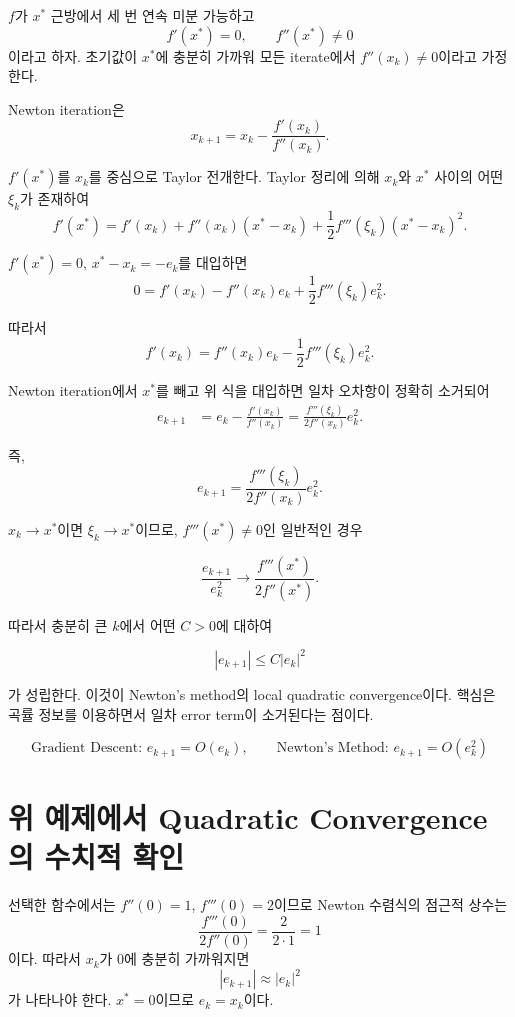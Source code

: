 \documentclass[11pt,a4paper]{article}
\begin{document}
$f$가 $x^*$ 근방에서 세 번 연속 미분 가능하고
\[
    f'(x^*)=0,
    \qquad
    f''(x^*)\neq 0
\]
이라고 하자. 초기값이 $x^*$에 충분히 가까워 모든 iterate에서
$f''(x_k)\neq0$이라고 가정한다.

Newton iteration은
\[
    x_{k+1}
    =
    x_k-\frac{f'(x_k)}{f''(x_k)}.
\]

$f'(x^*)$를 $x_k$를 중심으로 Taylor 전개한다. Taylor 정리에 의해
$x_k$와 $x^*$ 사이의 어떤 $\xi_k$가 존재하여
\[
    f'(x^*)
    =
    f'(x_k)
    +
    f''(x_k)(x^*-x_k)
    +
    \frac12 f'''(\xi_k)(x^*-x_k)^2.
\]

$f'(x^*)=0$, $x^*-x_k=-e_k$를 대입하면
\[
    0
    =
    f'(x_k)
    -
    f''(x_k)e_k
    +
    \frac12 f'''(\xi_k)e_k^2.
\]

따라서
\[
    f'(x_k)
    =
    f''(x_k)e_k
    -
    \frac12 f'''(\xi_k)e_k^2.
\]

Newton iteration에서 $x^*$를 빼고 위 식을 대입하면 일차 오차항이 정확히 소거되어
\[
\begin{aligned}
e_{k+1}
&=
e_k-\frac{f'(x_k)}{f''(x_k)}=
\frac{f'''(\xi_k)}{2f''(x_k)}e_k^2.
\end{aligned}
\]

즉,
\[
    \boxed{
    e_{k+1}
    =
    \frac{f'''(\xi_k)}{2f''(x_k)}e_k^2
    }.
\]

$x_k\to x^*$이면 $\xi_k\to x^*$이므로, $f'''(x^*)\neq0$인 일반적인 경우

\[
    \frac{e_{k+1}}{e_k^2}
    \longrightarrow
    \frac{f'''(x^*)}{2f''(x^*)}.
\]

따라서 충분히 큰 $k$에서 어떤 $C>0$에 대하여

\[
    |e_{k+1}|
    \le
    C|e_k|^2
\]

가 성립한다. 이것이 Newton's method의 local quadratic convergence이다.
핵심은 곡률 정보를 이용하면서 일차 error term이 소거된다는 점이다.

\[
    \boxed{
    \text{Gradient Descent: }e_{k+1}=O(e_k),
    \qquad
    \text{Newton's Method: }e_{k+1}=O(e_k^2)
    }
\]

\section{위 예제에서 Quadratic Convergence의 수치적 확인}

선택한 함수에서는 $f''(0)=1$, $f'''(0)=2$이므로
Newton 수렴식의 점근적 상수는
\[
\frac{f'''(0)}{2f''(0)}
=
\frac{2}{2\cdot 1}
=
1
\]
이다. 따라서 $x_k$가 $0$에 충분히 가까워지면
\[
|e_{k+1}| \approx |e_k|^2
\]
가 나타나야 한다. $x^*=0$이므로 $e_k=x_k$이다.
\end{document}
